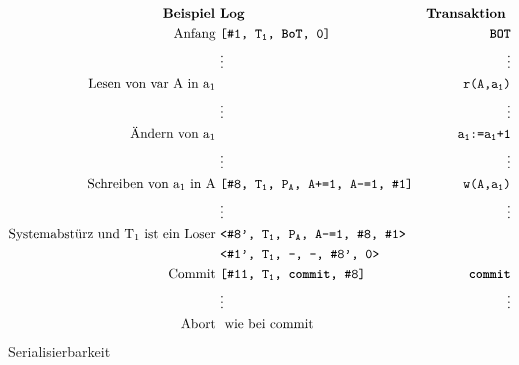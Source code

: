 \documentclass{article}
\begin{document}
		\begin{align*}
			\textbf{Beispiel } 								& \textbf{Log } 													& \textbf{Transaktion } \\
			\text{Anfang } 									& \texttt{[\#1, T$_\texttt{1}$, \textbf{BoT}, 0]} 					& \texttt{\textbf{BOT}}\\
															& \vdots 															& \vdots \\
			\text{Lesen von var A in a$_1$ } 				& 																	& \texttt{r(A,a$_\texttt{1}$)}\\
															& \vdots 															& \vdots \\
			\text{\"Andern von a$_1$ } 						& 																	& \texttt{ a$_\texttt{1}$:=a$_\texttt{1}$+1}\\
															& \vdots 															& \vdots \\
			\text{Schreiben von a$_1$ in A } 				& \texttt{[\#8, T$_\texttt{1}$, P$_\texttt{A}$, A+=1, A-=1, \#1]} 	& \texttt{w(A,a$_\texttt{1}$)}\\
															& \vdots 															& \vdots \\
			\text{Systemabst\"urz und T$_1$ ist ein Loser } & \texttt{<\#8', T$_\texttt{1}$, P$_\texttt{A}$, A-=1, \#8, \#1>}	& \\
															& \texttt{<\#1', T$_\texttt{1}$, -, -, \#8', 0>}	& \\
			\text{Commit } 									& \texttt{[\#11, T$_\texttt{1}$, \textbf{commit}, \#8]} 			& \texttt{\textbf{commit}}\\
															& \vdots 															& \vdots \\
			\text{Abort } 									& \text{ wie bei commit}\\
		\end{align*}
		Serialisierbarkeit
\end{document}
